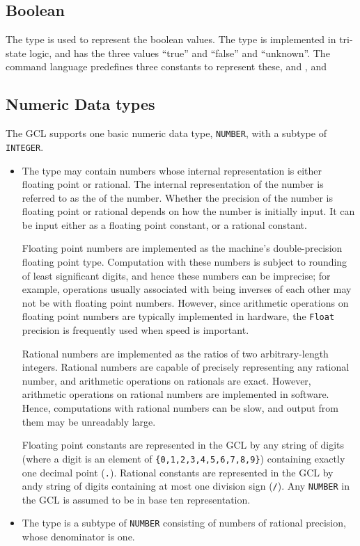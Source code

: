 \subsection{Boolean}
The  type is used to represent the boolean values.
The  type is implemented in tri-state logic,
and has the three values ``true'' and ``false'' and ``unknown''.  The
command language predefines three constants to represent these,
 and , and 

\subsection{Numeric Data types}

The GCL supports one basic numeric data type, \verb+NUMBER+, with a 
subtype of \verb+INTEGER+.

\begin{itemize}
\item {}

The  type may contain numbers whose internal
representation is either floating point or rational.  The internal
representation of the number is referred to as the 
of the number.  Whether the precision of the number is floating point
or rational depends on how the number is initially input.  It can be
input either as a floating point constant, or a rational constant.

Floating point numbers are implemented as the machine's
double-precision floating point type.  Computation with these numbers
is subject to rounding of least significant digits, and hence these
numbers can be imprecise; for example, operations usually associated
with being inverses of each other may not be with floating point
numbers. However, since arithmetic operations on floating point
numbers are typically implemented in hardware, the {\tt Float}
precision is frequently used when speed is important.

Rational numbers are implemented as the ratios of two arbitrary-length
integers. Rational numbers are capable of precisely representing any
rational number, and arithmetic operations on rationals are exact.
However, arithmetic operations on rational numbers are implemented in
software.  Hence, computations with rational numbers can be slow, and
output from them may be unreadably large.

Floating point constants are represented in the GCL by any string of
digits (where a digit is an element of \verb+{0,1,2,3,4,5,6,7,8,9}+)
containing exactly one decimal point (\verb+.+).  Rational constants
are represented in the GCL by andy string of digits containing at most
one division sign (\verb+/+).  Any \verb+NUMBER+ in the GCL is assumed
to be in base ten representation.

\item {}

The  type is a subtype of \verb+NUMBER+ consisting of
numbers of rational precision, whose denominator is one.  

\end{itemize}


